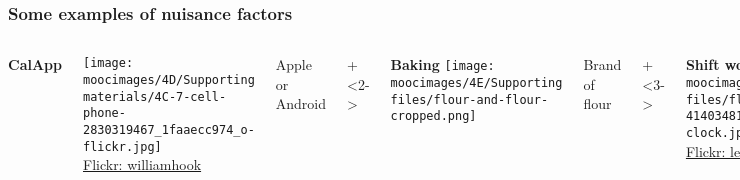 \documentclass[handout,11pt,aspectratio=169,mathserif]{beamer}
\begin{document}
\begin{frame}\frametitle{Some examples of nuisance factors}
	\begin{columns}[t]
			\textbf{CalApp}
			
			\texttt{[image: \\moocimages/4D/Supporting materials/4C-7-cell-phone-2830319467\_1faaecc974\_o-flickr.jpg]}
			\\
			{\tiny{\href{https://secure.flickr.com/photos/williamhook/2830319467/}{Flickr: williamhook}}}
			
			\vspace{1cm}
			Apple or Android 
		
		
			\onslide+<2->{
				\textbf{Baking}
				\texttt{[image: \\moocimages/4E/Supporting files/flour-and-flour-cropped.png]}
		
				\vspace{1.1cm}
				Brand of flour
			}
			
			\onslide+<3->{
				\textbf{Shift work}
				\texttt{[image: \\moocimages/4E/Supporting files/flickr-4140348113\_f0efc8235b\_z-clock.jpg]}
				\\
				{\tiny{\href{https://secure.flickr.com/photos/leehaywood/4140348113}{Flickr: leehaywood}}}
				
				
				
				\vspace{0.8cm}
				Day shift or night shift
			}
		
			\onslide+<4->{
				\textbf{Gas mileage}
				
				\texttt{[image: \\moocimages/4D/Supporting materials/4C-6-gas-mileage.png]}
				
				\vspace{1.65cm}
				Driver 1 or driver 2
			}
			
	\end{columns}
			
\end{frame}
\end{document}
